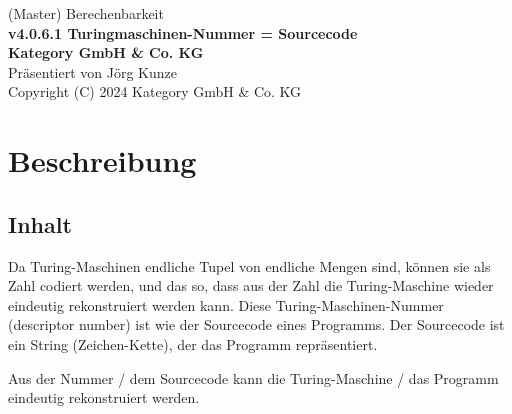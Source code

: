 \documentclass[a4paper]{amsart}
\theoremstyle{definition}
\begin{document}
\begin{titlepage}
\centering
{\huge
(Master) Berechenbarkeit\\[1cm]
\textbf{v4.0.6.1 Turingmaschinen-Nummer = Sourcecode}
}\\[1cm]

\textbf{Kategory GmbH \& Co. KG}\\
Präsentiert von Jörg Kunze\\
Copyright (C) 2024 Kategory GmbH \& Co. KG

\end{titlepage}

%

\newpage

\section*{Beschreibung}

\subsection*{Inhalt}
Da Turing-Maschinen endliche Tupel von endliche  Mengen sind, können sie als Zahl codiert werden, und das so, dass aus der Zahl die Turing-Maschine wieder eindeutig rekonstruiert werden kann. Diese Turing-Maschinen-Nummer (descriptor number) ist wie der Sourcecode eines Programms. Der Sourcecode ist ein String (Zeichen-Kette), der das Programm repräsentiert.

Aus der Nummer / dem Sourcecode kann die Turing-Maschine / das Programm eindeutig rekonstruiert werden. 
\end{document}
